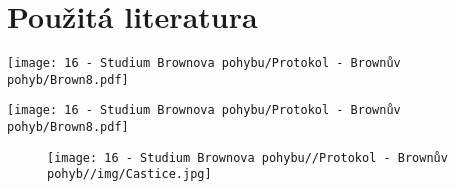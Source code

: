 \documentclass{prepareprotokol} %
\begin{document}
\maketitle


\setlength{\parindent}{0.5cm}





\section{Použitá literatura}		
\begingroup
\renewcommand{\section}[2]{}

\endgroup




\texttt{[image: 16 - Studium Brownova pohybu/Protokol - Brownův pohyb/Brown8.pdf]}

\texttt{[image: 16 - Studium Brownova pohybu/Protokol - Brownův pohyb/Brown8.pdf]}

\begin{figure}[h]
    \centering
    \texttt{[image: 16 - Studium Brownova pohybu//Protokol - Brownův pohyb//img/Castice.jpg]}
\end{figure}

				
\end{document}
